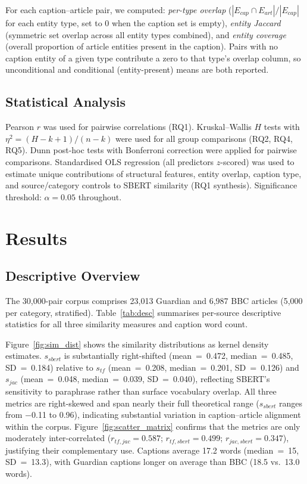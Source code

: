 \documentclass[11pt,a4paper]{article}
\begin{document}
For each caption--article pair, we computed: \textit{per-type overlap}
($|E_{cap} \cap E_{art}| / |E_{cap}|$ for each entity type, set to 0
when the caption set is empty), \textit{entity Jaccard} (symmetric set
overlap across all entity types combined), and \textit{entity coverage}
(overall proportion of article entities present in the caption). Pairs
with no caption entity of a given type contribute a zero to that type's
overlap column, so unconditional and conditional (entity-present) means
are both reported.

\subsection{Statistical Analysis}

Pearson $r$ was used for pairwise correlations (RQ1). Kruskal--Wallis
$H$ tests with $\eta^2 = (H - k + 1)/(n - k)$ were used for all group
comparisons (RQ2, RQ4, RQ5). Dunn post-hoc tests with Bonferroni
correction were applied for pairwise comparisons. Standardised OLS
regression (all predictors $z$-scored) was used to estimate unique
contributions of structural features, entity overlap, caption type, and
source/category controls to SBERT similarity (RQ1 synthesis). Significance
threshold: $\alpha = 0.05$ throughout.

\section{Results}

\subsection{Descriptive Overview}

The 30,000-pair corpus comprises 23,013 Guardian and 6,987 BBC articles
(5,000 per category, stratified). Table~\ref{tab:desc} summarises
per-source descriptive statistics for all three similarity measures and
caption word count.

Figure~\ref{fig:sim_dist} shows the similarity distributions as kernel
density estimates. $s_{sbert}$ is substantially right-shifted
(mean~=~0.472, median~=~0.485, SD~=~0.184) relative to $s_{tf}$
(mean~=~0.208, median~=~0.201, SD~=~0.126) and $s_{jac}$
(mean~=~0.048, median~=~0.039, SD~=~0.040), reflecting SBERT's sensitivity
to paraphrase rather than surface vocabulary overlap. All three metrics are
right-skewed and span nearly their full theoretical range ($s_{sbert}$
ranges from $-$0.11 to 0.96), indicating substantial variation in
caption--article alignment within the corpus. Figure~\ref{fig:scatter_matrix}
confirms that the metrics are only moderately inter-correlated
($r_{tf,jac} = 0.587$; $r_{tf,sbert} = 0.499$; $r_{jac,sbert} = 0.347$),
justifying their complementary use. Captions average 17.2 words
(median~=~15, SD~=~13.3), with Guardian captions longer on average than
BBC (18.5 vs.\ 13.0 words).
\end{document}
